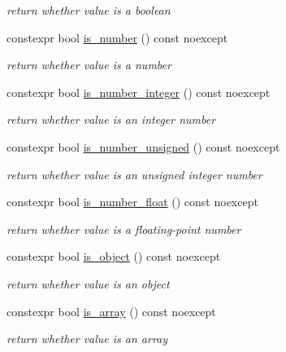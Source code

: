 \begin{DoxyCompactItemize}
\begin{DoxyCompactList}\small\item\em return whether value is a boolean \end{DoxyCompactList}\item 
constexpr bool \hyperlink{classnlohmann_1_1basic__json_a1407f91b4689bbc56d1a3c401a5bb649}{is\+\_\+number} () const  noexcept
\begin{DoxyCompactList}\small\item\em return whether value is a number \end{DoxyCompactList}\item 
constexpr bool \hyperlink{classnlohmann_1_1basic__json_a87499fdb56ca6f0df2242c3335c3dc9b}{is\+\_\+number\+\_\+integer} () const  noexcept
\begin{DoxyCompactList}\small\item\em return whether value is an integer number \end{DoxyCompactList}\item 
constexpr bool \hyperlink{classnlohmann_1_1basic__json_a693b411d9c5ad0d168a0013cfb80b8e5}{is\+\_\+number\+\_\+unsigned} () const  noexcept
\begin{DoxyCompactList}\small\item\em return whether value is an unsigned integer number \end{DoxyCompactList}\item 
constexpr bool \hyperlink{classnlohmann_1_1basic__json_a628733b45cd0e32bd59efea149f40b4b}{is\+\_\+number\+\_\+float} () const  noexcept
\begin{DoxyCompactList}\small\item\em return whether value is a floating-\/point number \end{DoxyCompactList}\item 
constexpr bool \hyperlink{classnlohmann_1_1basic__json_a0d96ff13001977a93d65f0a97279d316}{is\+\_\+object} () const  noexcept
\begin{DoxyCompactList}\small\item\em return whether value is an object \end{DoxyCompactList}\item 
constexpr bool \hyperlink{classnlohmann_1_1basic__json_a1af360cb513cc32f28e80ddd0b9d7666}{is\+\_\+array} () const  noexcept
\begin{DoxyCompactList}\small\item\em return whether value is an array \end{DoxyCompactList}\item 

\end{DoxyCompactItemize}
